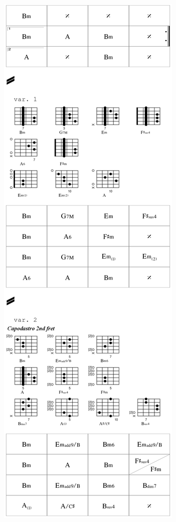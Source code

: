  \begin{figure}[H]
\begin{center}
\includegraphics[scale=0.22]{img/k540}
\end{center}
\end{figure}

